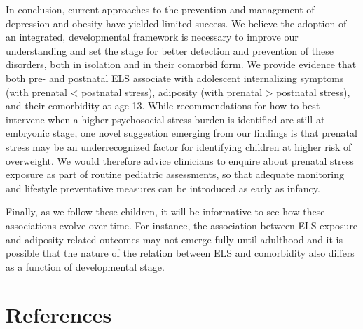 \documentclass[
  letterpaper,
  DIV=11,
  numbers=noendperiod]{scrreport}
\begin{document}
In conclusion, current approaches to the prevention and management of
depression and obesity have yielded limited success. We believe the
adoption of an integrated, developmental framework is necessary to
improve our understanding and set the stage for better detection and
prevention of these disorders, both in isolation and in their comorbid
form. We provide evidence that both pre- and postnatal ELS associate
with adolescent internalizing symptoms (with prenatal \textless{}
postnatal stress), adiposity (with prenatal \textgreater{} postnatal
stress), and their comorbidity at age 13. While recommendations for how
to best intervene when a higher psychosocial stress burden is identified
are still at embryonic stage, one novel suggestion emerging from our
findings is that prenatal stress may be an underrecognized factor for
identifying children at higher risk of overweight. We would therefore
advice clinicians to enquire about prenatal stress exposure as part of
routine pediatric assessments, so that adequate monitoring and lifestyle
preventative measures can be introduced as early as infancy.

Finally, as we follow these children, it will be informative to see how
these associations evolve over time. For instance, the association
between ELS exposure and adiposity-related outcomes may not emerge fully
until adulthood and it is possible that the nature of the relation
between ELS and comorbidity also differs as a function of developmental
stage.

\section*{References}\label{references-1}

\end{document}
